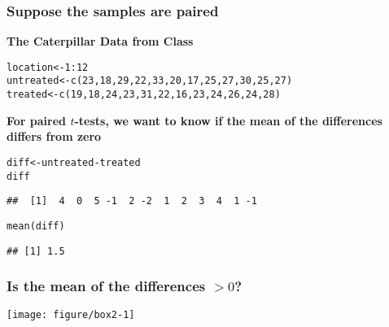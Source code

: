 \documentclass[color=usenames,dvipsnames]{beamer}\usepackage[]{graphicx}\usepackage[]{color}
\makeatletter
\newcommand{\hlnum}[1]{\textcolor[rgb]{0.69,0.494,0}{#1}}%
\newcommand{\hlopt}[1]{\textcolor[rgb]{0,0,0}{#1}}%
\newcommand{\hlstd}[1]{\textcolor[rgb]{0,0,0}{#1}}%
\newcommand{\hlkwb}[1]{\textcolor[rgb]{0,0.341,0.682}{#1}}%
\newcommand{\hlkwd}[1]{\textcolor[rgb]{0.004,0.004,0.506}{#1}}%
\newenvironment{kframe}{%
 \def\at@end@of@kframe{}%
 \ifinner\ifhmode%
  \def\at@end@of@kframe{\end{minipage}}%
  \begin{minipage}{\columnwidth}%
 \fi\fi%
 \def\FrameCommand##1{\hskip\@totalleftmargin \hskip-\fboxsep
 \colorbox{shadecolor}{##1}\hskip-\fboxsep
     \hskip-\linewidth \hskip-\@totalleftmargin \hskip\columnwidth}%
 \MakeFramed {\advance\hsize-\width
   \@totalleftmargin\z@ \linewidth\hsize
   \@setminipage}}%
 {\par\unskip\endMakeFramed%
 \at@end@of@kframe}
\newenvironment{knitrout}{}{} %
\makeatother
\begin{document}
\begin{frame}[fragile]
  \frametitle{Suppose the samples are paired}
  {\bf The Caterpillar Data from Class}
\begin{knitrout}
\color{fgcolor}\begin{kframe}
\begin{alltt}
\hlstd{location} \hlkwb{<-} \hlnum{1}\hlopt{:}\hlnum{12}
\hlstd{untreated} \hlkwb{<-} \hlkwd{c}\hlstd{(}\hlnum{23}\hlstd{,}\hlnum{18}\hlstd{,}\hlnum{29}\hlstd{,}\hlnum{22}\hlstd{,}\hlnum{33}\hlstd{,}\hlnum{20}\hlstd{,}\hlnum{17}\hlstd{,}\hlnum{25}\hlstd{,}\hlnum{27}\hlstd{,}\hlnum{30}\hlstd{,}\hlnum{25}\hlstd{,}\hlnum{27}\hlstd{)}
\hlstd{treated} \hlkwb{<-} \hlkwd{c}\hlstd{(}\hlnum{19}\hlstd{,}\hlnum{18}\hlstd{,}\hlnum{24}\hlstd{,}\hlnum{23}\hlstd{,}\hlnum{31}\hlstd{,}\hlnum{22}\hlstd{,}\hlnum{16}\hlstd{,}\hlnum{23}\hlstd{,}\hlnum{24}\hlstd{,}\hlnum{26}\hlstd{,}\hlnum{24}\hlstd{,}\hlnum{28}\hlstd{)}
\end{alltt}
\end{kframe}
\end{knitrout}
  \pause
  \vfill
  {\bf For paired $t$-tests, we want to know if the mean of the
    differences differs from zero}
  \vfill
  \pause
\begin{knitrout}
\color{fgcolor}\begin{kframe}
\begin{alltt}
\hlstd{diff} \hlkwb{<-} \hlstd{untreated}\hlopt{-}\hlstd{treated}
\hlstd{diff}
\end{alltt}
\begin{verbatim}
##  [1]  4  0  5 -1  2 -2  1  2  3  4  1 -1
\end{verbatim}
\begin{alltt}
\hlkwd{mean}\hlstd{(diff)}
\end{alltt}
\begin{verbatim}
## [1] 1.5
\end{verbatim}
\end{kframe}
\end{knitrout}

\end{frame}





\begin{frame}[fragile]
  \frametitle{Is the mean of the differences $>0$?}
  \begin{center}
  \footnotesize

\vspace{-.2cm}
\texttt{[image: figure/box2-1]}
  \end{center}
\end{frame}
\end{document}
